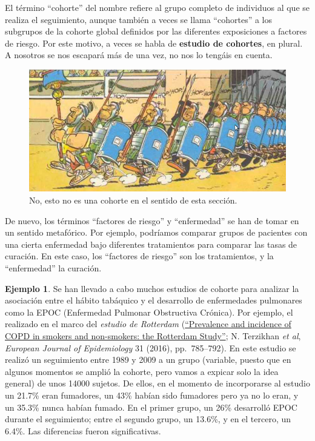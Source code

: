 \documentclass[
]{book}
\theoremstyle{definition}
\theoremstyle{definition}
\newtheorem{example}{Ejemplo}[chapter]
\theoremstyle{definition}
\theoremstyle{definition}
\theoremstyle{remark}
\begin{document}
\begin{rmdnote}
El término ``cohorte'' del nombre refiere al grupo completo de individuos al que se realiza el seguimiento, aunque también a veces se llama ``cohortes'' a los subgrupos de la cohorte global definidos por las diferentes exposiciones a factores de riesgo. Por este motivo, a veces se habla de \textbf{estudio de cohortes}, en plural. A nosotros se nos escapará más de una vez, no nos lo tengáis en cuenta.
\end{rmdnote}

\begin{figure}

{\centering \includegraphics[width=0.8\linewidth]{INREMDN_files/figure-html/cohorteasterix} 

}

\caption{No, esto no es una cohorte en el sentido de esta sección.}\label{fig:cohorteAsterix}
\end{figure}

\begin{rmdcaution}
De nuevo, los términos ``factores de riesgo'' y ``enfermedad'' se han de tomar en un sentido metafórico. Por ejemplo, podríamos comparar grupos de pacientes con una cierta enfermedad bajo diferentes tratamientos para comparar las tasas de curación. En este caso, los ``factores de riesgo'' son los tratamientos, y la ``enfermedad'' la curación.
\end{rmdcaution}

\begin{example}
\protect\hypertarget{exm:EPCOCoh}{}\label{exm:EPCOCoh}Se han llevado a cabo muchos estudios de cohorte para analizar la asociación entre el hábito tabáquico y el desarrollo de enfermedades pulmonares como la EPOC (Enfermedad Pulmonar Obstructiva Crónica). Por ejemplo, el realizado en el marco del \emph{estudio de Rotterdam} (\href{https://link.springer.com/article/10.1007/s10654-016-0132-z}{``Prevalence and incidence of COPD in smokers and non-smokers: the Rotterdam Study''}; N. Terzikhan \emph{et al}, \emph{European Journal of Epidemiology} 31 (2016), pp.~785--792). En este estudio se realizó un seguimiento entre 1989 y 2009 a un grupo (variable, puesto que en algunos momentos se amplió la cohorte, pero vamos a expicar solo la idea general) de unos 14000 sujetos. De ellos, en el momento de incorporarse al estudio un 21.7\% eran fumadores, un 43\% habían sido fumadores pero ya no lo eran, y un 35.3\% nunca habían fumado. En el primer grupo, un 26\% desarrolló EPOC durante el seguimiento; entre el segundo grupo, un 13.6\%, y en el tercero, un 6.4\%. Las diferencias fueron significativas.
\end{example}
\end{document}
